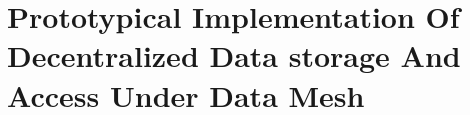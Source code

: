 \chapter{Prototypical Implementation Of Decentralized Data storage And Access Under Data Mesh
}
\label{chap: Prototypical implementation of decentralised data storage and access under Data Mesh}

